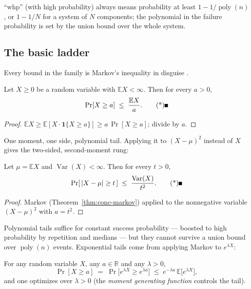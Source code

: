 \begin{remarkbox}[Notation]
``whp'' (with high probability) always means probability at least
$1 - 1/\operatorname{poly}(n)$, or $1 - 1/N$ for a system of $N$ components; the
polynomial in the failure probability is set by the union bound over the whole system.
\end{remarkbox}

\subsection{The basic ladder}
\label{sec:conc-ladder}

Every bound in the family is Markov's inequality in disguise
\cite{concentration-ineq-bg5,concentration-ineq-bg6,concentration-ineq-bg7}.

\begin{theorem}[Markov]\label{thm:conc-markov}
Let $X \ge 0$ be a random variable with $\mathbb{E}X < \infty$. Then for every $a > 0$,
\[
\Pr[X \ge a] \;\le\; \frac{\mathbb{E}X}{a}. \eopm
\]
\end{theorem}

\begin{proof}
$\mathbb{E}X \ge \mathbb{E}[X \cdot \mathbf{1}\{X \ge a\}] \ge a\,\Pr[X \ge a]$; divide by $a$.
\end{proof}

One moment, one side, polynomial tail. Applying it to $(X-\mu)^2$ instead of $X$ gives the
two-sided, second-moment rung:

\begin{corollary}[Chebyshev]\label{cor:conc-chebyshev}
Let $\mu = \mathbb{E}X$ and $\operatorname{Var}(X) < \infty$. Then for every $t > 0$,
\[
\Pr[\,|X - \mu| \ge t\,] \;\le\; \frac{\operatorname{Var}(X)}{t^2}. \eopm
\]
\end{corollary}

\begin{proof}
Markov (Theorem~\ref{thm:conc-markov}) applied to the nonnegative variable $(X-\mu)^2$
with $a = t^2$.
\end{proof}

Polynomial tails suffice for constant success probability --- boosted to high probability
by repetition and medians --- but they cannot survive a union bound over
$\operatorname{poly}(n)$ events. Exponential tails come from applying Markov to
$e^{\lambda X}$:

\begin{lemma}\label{lem:conc-chernoff-method}
For any random variable $X$, any $a \in \mathbb{R}$ and any $\lambda > 0$,
\[
\Pr[X \ge a] \;=\; \Pr\bigl[e^{\lambda X} \ge e^{\lambda a}\bigr] \;\le\;
e^{-\lambda a}\,\mathbb{E}\bigl[e^{\lambda X}\bigr],
\]
and one optimizes over $\lambda > 0$ (the \emph{moment generating function} controls the
tail). \eop
\end{lemma}

